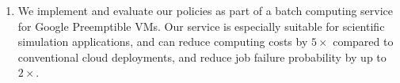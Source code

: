 \begin{enumerate} [leftmargin=12pt]

\item We implement and evaluate our policies as part of a batch computing service for Google Preemptible VMs. Our service is especially suitable for scientific simulation applications, and can reduce computing costs by $5\times$ compared to conventional cloud deployments, and reduce job failure probability by up to  $2\times$. 

 
\end{enumerate}







